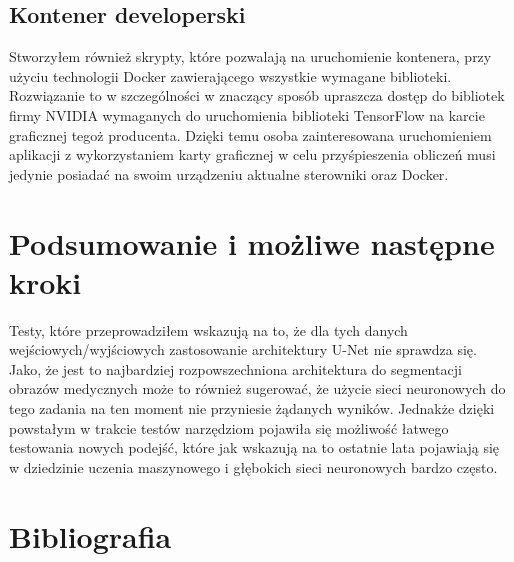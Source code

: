\documentclass{article}
\begin{document}
\subsection{Kontener developerski}
Stworzyłem również skrypty, które pozwalają na uruchomienie kontenera, przy użyciu technologii Docker zawierającego wszystkie wymagane biblioteki.
Rozwiązanie to w szczególności w znaczący sposób upraszcza dostęp do bibliotek firmy NVIDIA wymaganych do uruchomienia biblioteki TensorFlow na karcie graficznej tegoż producenta.
Dzięki temu osoba zainteresowana uruchomieniem aplikacji z wykorzystaniem karty graficznej w celu przyśpieszenia obliczeń musi jedynie posiadać na swoim urządzeniu aktualne sterowniki oraz Docker.
\newpage
\section{Podsumowanie i możliwe następne kroki}
Testy, które przeprowadziłem wskazują na to, że dla tych danych wejściowych/wyjściowych zastosowanie architektury U-Net nie sprawdza się.
Jako, że jest to najbardziej rozpowszechniona architektura do segmentacji obrazów medycznych może to również sugerować, że użycie sieci neuronowych do tego zadania na ten moment nie przyniesie żądanych wyników.
Jednakże dzięki powstałym w trakcie testów narzędziom pojawiła się możliwość łatwego testowania nowych podejść, które jak wskazują na to ostatnie lata pojawiają się w dziedzinie uczenia maszynowego i głębokich sieci neuronowych bardzo często.
\newpage
\section{Bibliografia}
\end{document}
